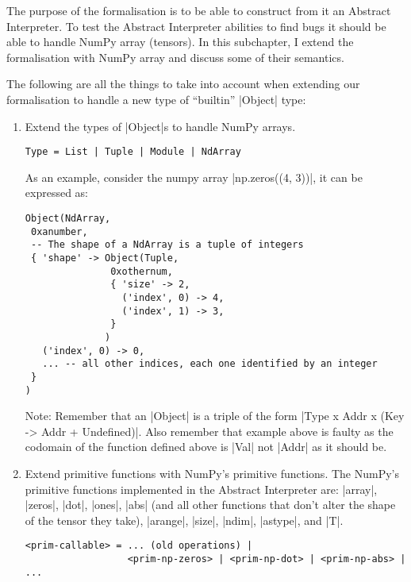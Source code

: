 The purpose of the formalisation is to be able to construct from it an
Abstract Interpreter. To test the Abstract Interpreter abilities to find
bugs it should be able to handle NumPy array (tensors). In this
subchapter, I extend the formalisation with NumPy array and discuss some
of their semantics.

The following are all the things to take into account when extending our
formalisation to handle a new type of \enquote{builtin} \pycode|Object|
type:

\begin{enumerate}
\def\labelenumi{\arabic{enumi}.}
\item
  Extend the types of \pycode|Object|s to handle NumPy arrays.

\begin{verbatim}
Type = List | Tuple | Module | NdArray
\end{verbatim}

  As an example, consider the numpy array \pycode|np.zeros((4, 3))|, it
  can be expressed as:

\begin{verbatim}
Object(NdArray,
 0xanumber,
 -- The shape of a NdArray is a tuple of integers
 { 'shape' -> Object(Tuple,
               0xothernum,
               { 'size' -> 2,
                 ('index', 0) -> 4,
                 ('index', 1) -> 3,
               }
              )
   ('index', 0) -> 0,
   ... -- all other indices, each one identified by an integer
 }
)
\end{verbatim}

  Note: Remember that an \pycode|Object| is a triple of the form
  \pycode|Type x Addr x (Key -> Addr + Undefined)|.
  Also remember that example above is faulty as the codomain of the
  function defined above is \pycode|Val| not \pycode|Addr| as it should
  be.
\item
  Extend primitive functions with NumPy's primitive functions. The
  NumPy's primitive functions implemented in the Abstract Interpreter
  are: \pycode|array|, \pycode|zeros|, \pycode|dot|, \pycode|ones|,
  \pycode|abs| (and all other functions that don't alter the shape of
  the tensor they take), \pycode|arange|, \pycode|size|, \pycode|ndim|,
  \pycode|astype|, and \pycode|T|.

\begin{verbatim}
<prim-callable> = ... (old operations) |
                  <prim-np-zeros> | <prim-np-dot> | <prim-np-abs> | ...
\end{verbatim}


\end{enumerate}
